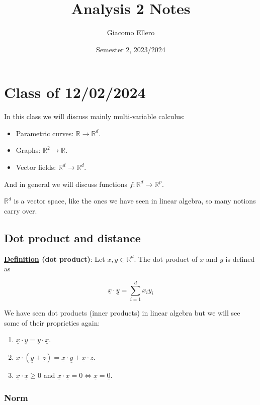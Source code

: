 \documentclass[10pt]{extarticle}
\title{Analysis 2 Notes}
\author{Giacomo Ellero}
\date{Semester 2, 2023/2024}
\newcommand{\R}{\mathbb{R}}
\begin{document}
\maketitle
\tableofcontents
\clearpage

\section{Class of 12/02/2024}

In this class we will discuss mainly multi-variable calculus:
\begin{itemize}
    \item Parametric curves: $\R \to \R^d$.
    \item Graphs: $\R^2 \to \R$.
    \item Vector fields: $\R^d \to \R^d$.
\end{itemize}

And in general we will discuss functions $f: \R^d \to \R^p$.

$\R^d$ is a vector space, like the ones we have seen in linear algebra, so many notions carry over.

\subsection{Dot product and distance}

\textbf{\underline{Definition} (dot product)}: Let $x, y \in \R^d$. The dot product of $x$ and $y$ is defined as

$$
    \underline{x} \cdot \underline{y} = \sum_{i=1}^d x_i y_i
$$

We have seen dot products (inner products) in linear algebra but we will see some of their proprieties again:
\begin{enumerate}
    \item $\underline{x} \cdot \underline{y} = \underline{y} \cdot \underline{x}$.
    \item $\underline{x} \cdot (\underline{y} + \underline{z}) = \underline{x} \cdot \underline{y} + \underline{x} \cdot \underline{z}$.
    \item $\underline{x} \cdot \underline{x} \geq 0$ and $\underline{x} \cdot \underline{x} = 0 \iff \underline{x} = \underline{0}$.
\end{enumerate}

\subsubsection{Norm}
\end{document}

